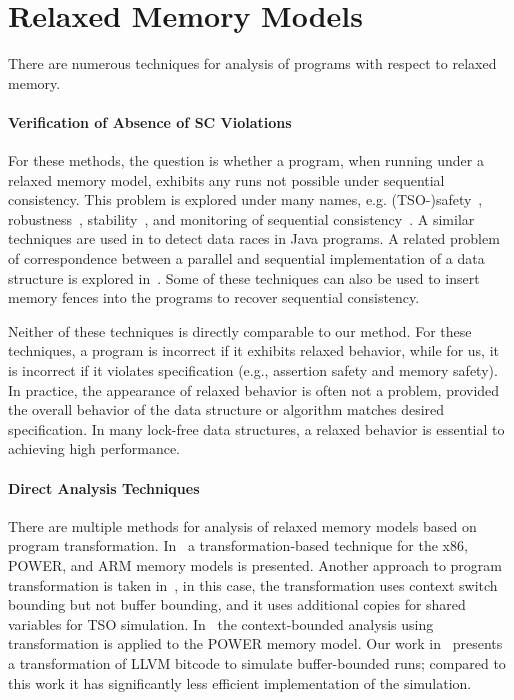 \section{Relaxed Memory Models}

There are numerous techniques for analysis of programs with respect to relaxed memory.

\paragraph{Verification of Absence of SC Violations}

For these methods, the question is whether a program, when running under a relaxed memory model, exhibits any runs not possible under sequential consistency.
This problem is explored under many names, e.g. (TSO-)safety~\cite{Burckhardt2008}, robustness~\cite{Bouajjani2013,Derevenetc2014}, stability~\cite{Alglave2011}, and monitoring of sequential consistency~\cite{Burnim2011}.
A similar techniques are used in \cite{Yang2004} to detect data races in Java programs.
A related problem of correspondence between a parallel and sequential implementation of a data structure is explored in~\cite{Ou2017}.
Some of these techniques can also be used to insert memory fences into the programs to recover sequential consistency.

Neither of these techniques is directly comparable to our method.
For these techniques, a program is incorrect if it exhibits relaxed behavior, while for us, it is incorrect if it violates specification (e.g., assertion safety and memory safety).
In practice, the appearance of relaxed behavior is often not a problem, provided the overall behavior of the data structure or algorithm matches desired specification.
In many lock-free data structures, a relaxed behavior is essential to achieving high performance.

\paragraph{Direct Analysis Techniques}

There are multiple methods for analysis of relaxed memory models based on program transformation.
In~\cite{Alglave2013} a transformation-based technique for the x86, POWER, and ARM memory models is presented.
Another approach to program transformation is taken in~\cite{Atig2011}, in this case, the transformation uses context switch bounding but not buffer bounding, and it uses additional copies for shared variables for TSO simulation.
In~\cite{Abdulla2017} the context-bounded analysis using transformation is applied to the POWER memory model.
Our work in~\cite{SRB15weakmem} presents a transformation of LLVM bitcode to simulate buffer-bounded \xtso runs; compared to this work it has significantly less efficient implementation of the \xtso simulation.


